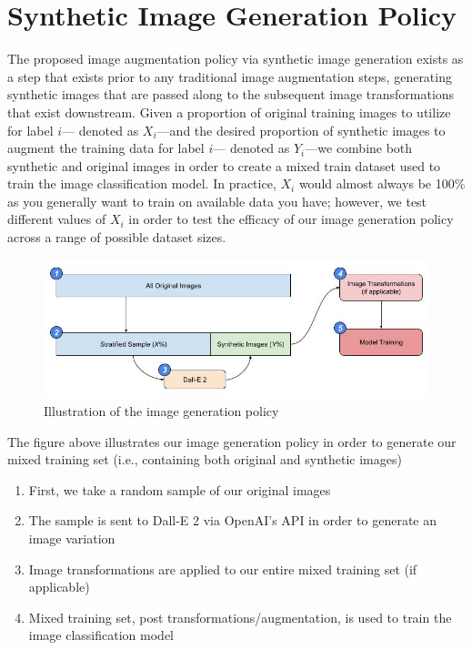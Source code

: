 \documentclass [MS] {uclathes}
\begin{document}
\section{Synthetic Image Generation Policy}
The proposed image augmentation policy via synthetic image generation exists as a step that exists prior to any 
traditional image augmentation steps, generating synthetic images that are passed along to the subsequent image 
transformations that exist downstream. Given a proportion of original training images to utilize for label \(i\)---
denoted as \(X_{i}\)---and the desired proportion of synthetic images to augment the training data for label \(i\)---
denoted as \(Y_{i}\)---we combine both synthetic and original images in order to create a mixed train dataset used to 
train the image classification model. In practice, \(X_{i}\) would almost always be 100\% as you generally want to train
on available data you have; however, we test different values of \(X_{i}\) in order to test the efficacy of our image 
generation policy across a range of possible dataset sizes.


\begin{figure} [H]
    \centering
    \includegraphics[width=1\linewidth]{figures/image_generation_policy.jpg}
    \caption{Illustration of the image generation policy}
    \label{fig:enter-label}
\end{figure}

The figure above illustrates our image generation policy in order to generate our mixed training set (i.e., containing 
both original and synthetic images)
\begin{enumerate}
    \item First, we take a random sample of our original images
    \item The sample is sent to Dall-E 2 via OpenAI's API in order to generate an image variation
    \item Image transformations are applied to our entire mixed training set (if applicable)
    \item Mixed training set, post transformations/augmentation, is used to train the image classification model
\end{enumerate}
\end{document}
